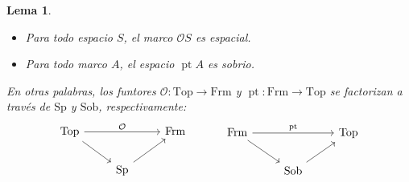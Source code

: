 \documentclass[12pt,letterpaper,titlepage]{article}
\newtheorem{lemma}{Lema}
\theoremstyle{definition}
\renewcommand\cal[1]{\mathcal{#1}}
\newcommand\<{\langle}
\renewcommand\>{\rangle}
\newcommand{\Frm}{\mathrm{Frm}}
\newcommand{\Top}{\mathrm{Top}}
\newcommand{\Sp}{\mathrm{Sp}}
\newcommand{\Sob}{\mathrm{Sob}}
\DeclareMathOperator{\pt}{pt}
\begin{document}
\begin{lemma}
    \leavevmode
    \begin{itemize}
        \item Para todo espacio $S$,
            el marco $\cal OS$ es espacial.
        \item Para todo marco $A$,
            el espacio $\pt A$ es sobrio.
    \end{itemize}
    En otras palabras, los funtores
    $\cal O:\Top\to\Frm$ y $\pt:\Frm\to\Top$ se factorizan
    a través de $\Sp$ y $\Sob$, respectivamente:
    \[
        \begin{tikzcd}
            \Top \ar[rr,"\cal O"] \ar[dr] && \Frm \\
            & \Sp \ar[ur]
        \end{tikzcd}
        \hspace{10mm}
        \begin{tikzcd}
            \Frm \ar[rr,"\pt"] \ar[dr] && \Top \\
            & \Sob \ar[ur]
        \end{tikzcd}
    \]
\end{lemma}
\end{document}
